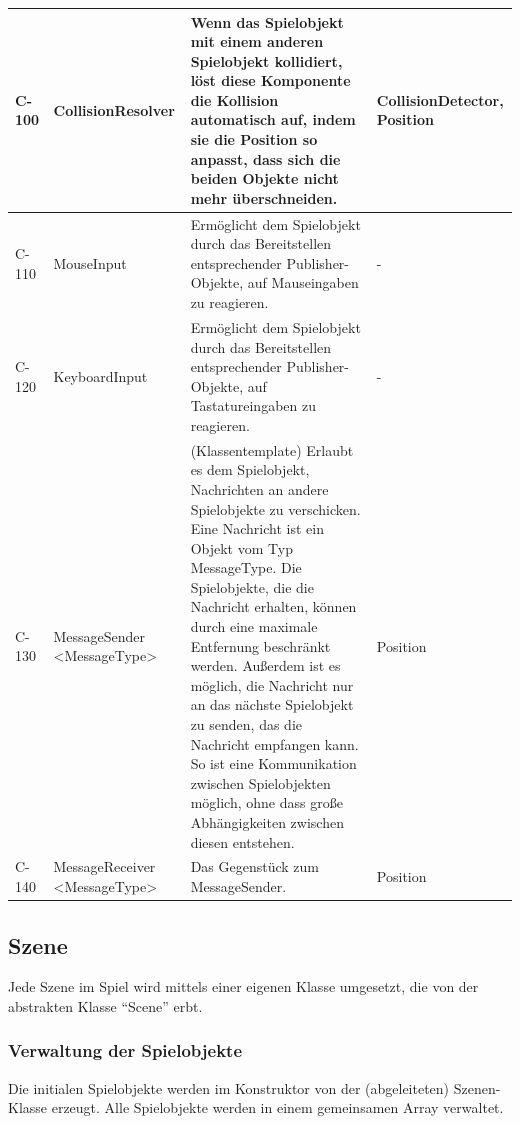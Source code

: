 \begin{longtable}{|l|p{3cm}|p{6cm}|p{3cm}|}
			C-100 	& CollisionResolver
					& Wenn das Spielobjekt mit einem anderen Spielobjekt kollidiert, löst diese Komponente die Kollision automatisch auf, indem sie die Position so anpasst, dass sich die beiden Objekte nicht mehr überschneiden.
						& CollisionDetector, Position
			\\ \hline

			C-110 	& MouseInput 
					& Ermöglicht dem Spielobjekt durch das Bereitstellen entsprechender Publisher-Objekte, auf Mauseingaben zu reagieren.
						& -

			\\ \hline

			C-120 	& KeyboardInput 
					& Ermöglicht dem Spielobjekt durch das Bereitstellen entsprechender Publisher-Objekte, auf Tastatureingaben zu reagieren.
						& -
			\\ \hline

			C-130 	& MessageSender <MessageType> 
					& (Klassentemplate) Erlaubt es dem Spielobjekt, Nachrichten an andere Spielobjekte zu verschicken. Eine Nachricht ist ein Objekt vom Typ MessageType.  Die Spielobjekte, die die Nachricht erhalten, können durch eine maximale Entfernung beschränkt werden. Außerdem ist es möglich, die Nachricht nur an das nächste Spielobjekt zu senden, das die Nachricht empfangen kann. So ist eine Kommunikation zwischen Spielobjekten möglich, ohne dass große Abhängigkeiten zwischen diesen entstehen.
						& Position
			\\ \hline
			
			C-140 	& MessageReceiver <MessageType> 
					& Das Gegenstück zum MessageSender.
						& Position
			\\ \hline
		\end{longtable}

	\subsection{Szene}
	
		Jede Szene im Spiel wird mittels einer eigenen Klasse umgesetzt, die von der abstrakten Klasse \enquote{Scene} erbt.

		\subsubsection{Verwaltung der Spielobjekte}
		
		Die initialen Spielobjekte werden im Konstruktor von der (abgeleiteten) Szenen-Klasse erzeugt. Alle Spielobjekte werden in einem gemeinsamen Array verwaltet.

